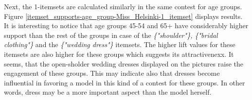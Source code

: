 
Next, the 1-itemsets are calculated similarly in the same contest for age groups. Figure \ref{itemset_supports-age_group-Miss_Helsinki-1_itemset} displays results. It is interesting to notice that age groups 45-54 and 65+ have considerably higher support than the rest of the groups in case of the \emph{\{"shoulder"\}, \{"bridal clothing"\}} and the \emph{\{"wedding dress"\}} itemsets. The higher lift values for these itemsets are also higher for these groups which suggests its attractivenexx. It seems, that the open-sholder wedding dresses displayed on the pictures raise the engagement of these groups. This may indicate also that dresses become influential in favoring a model in this kind of a contest for these groups. In other words, dress may be a more important aspect than the model herself.

